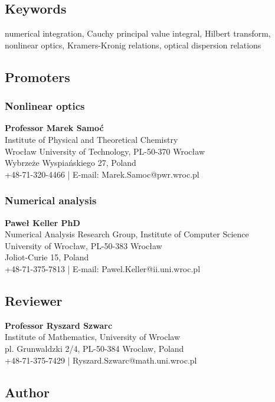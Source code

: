 \documentclass[12pt,twoside,a4paper]{article}
\numberwithin{equation}{subsection}
\numberwithin{figure}{subsection}
\begin{document}
\subsection*{Keywords} \label{chap:abstract_keywords}
numerical integration, Cauchy principal value integral, Hilbert transform, nonlinear optics, Kramers-Kronig relations, optical dispersion
relations

\subsection*{Promoters} \label{chap:abstract_promotors}

\subsubsection*{Nonlinear optics}

\textbf{Professor Marek Samoć} \\
Institute of Physical and Theoretical Chemistry \\
Wrocław University of Technology, PL-50-370 Wrocław \\
Wybrzeże Wyspiańskiego 27, Poland \\
+48-71-320-4466 | E-mail: Marek.Samoc@pwr.wroc.pl

\subsubsection*{Numerical analysis}

\textbf{Paweł Keller PhD} \\
Numerical Analysis Research Group, Institute of Computer Science \\
University of Wrocław, PL-50-383 Wrocław \\
Joliot-Curie 15, Poland \\
+48-71-375-7813 | E-mail: Pawel.Keller@ii.uni.wroc.pl


\subsection*{Reviewer}  \label{chap:abstract_reviewer}

\textbf{Professor Ryszard Szwarc} \\
Institute of Mathematics, University of Wroclaw \\
pl. Grunwaldzki 2/4, PL-50-384 Wroclaw, Poland \\
+48-71-375-7429 | Ryszard.Szwarc@math.uni.wroc.pl

\subsection*{Author}  \label{chap:abstract_author}
\end{document}
